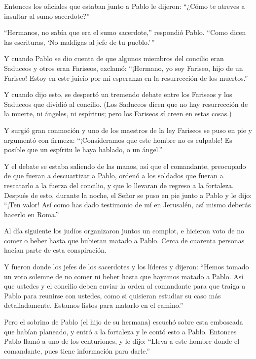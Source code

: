  Entonces los oficiales que estaban junto a Pablo le
dijeron: ``¿Cómo te atreves a insultar al sumo sacerdote?''

 ``Hermanos, no sabía que era el sumo sacerdote,'' respondió
Pablo. ``Como dicen las escrituras, `No maldigas al jefe de tu
pueblo.'\,''

 Y cuando Pablo se dio cuenta de que algunos miembros del
concilio eran Saduceos y otros eran Fariseos, exclamó: ``¡Hermano, yo
soy Fariseo, hijo de un Fariseo! Estoy en este juicio por mi esperanza
en la resurrección de los muertos.''

 Y cuando dijo esto, se despertó un tremendo debate entre
los Fariseos y los Saduceos que dividió al concilio.  (Los
Saduceos dicen que no hay resurrección de la muerte, ni ángeles, ni
espíritus; pero los Fariseos sí creen en estas cosas.)

 Y surgió gran conmoción y uno de los maestros de la ley
Fariseos se puso en pie y argumentó con firmeza: ``¡Consideramos que
este hombre no es culpable! Es posible que un espíritu le haya hablado,
o un ángel.''

 Y el debate se estaba saliendo de las manos, así que el
comandante, preocupado de que fueran a descuartizar a Pablo, ordenó a
los soldados que fueran a rescatarlo a la fuerza del concilio, y que lo
llevaran de regreso a la fortaleza.  Después de esto,
durante la noche, el Señor se puso en pie junto a Pablo y le dijo:
``¡Ten valor! Así como has dado testimonio de mí en Jerusalén, así mismo
deberás hacerlo en Roma.''

 Al día siguiente los judíos organizaron juntos un complot,
e hicieron voto de no comer o beber hasta que hubieran matado a Pablo.
 Cerca de cuarenta personas hacían parte de esta
conspiración.

 Y fueron donde los jefes de los sacerdotes y los líderes y
dijeron: ``Hemos tomado un voto solemne de no comer ni beber hasta que
hayamos matado a Pablo.  Así que ustedes y el concilio
deben enviar la orden al comandante para que traiga a Pablo para
reunirse con ustedes, como si quisieran estudiar su caso más
detalladamente. Estamos listos para matarlo en el camino.''

 Pero el sobrino de Pablo (el hijo de su hermana) escuchó
sobre esta emboscada que habían planeado, y entró a la fortaleza y le
contó esto a Pablo.  Entonces Pablo llamó a uno de los
centuriones, y le dijo: ``Lleva a este hombre donde el comandante, pues
tiene información para darle.''

